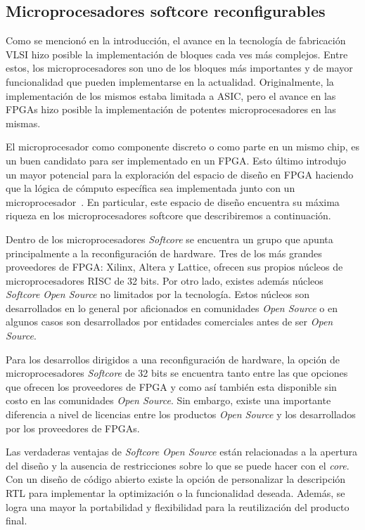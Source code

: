 \subsection{Microprocesadores softcore reconfigurables}

Como se mencionó en la introducción, el avance en la tecnología de
fabricación VLSI hizo posible la implementación de bloques cada ves
más complejos. Entre estos, los microprocesadores son uno de los
bloques más importantes y de mayor funcionalidad que pueden
implementarse en la actualidad. Originalmente, la implementación de
los mismos estaba limitada a ASIC, pero el avance en las FPGAs hizo
posible la implementación de potentes microprocesadores en las
mismas.

El microprocesador como componente discreto o como parte en un mismo 
chip, es un buen candidato para ser implementado en un FPGA. Esto último introdujo
 un mayor potencial para la exploración
del espacio de diseño en FPGA haciendo que la lógica de cómputo
específica sea implementada junto con un
microprocesador~\cite{Etiqueta05}. En particular, este espacio de
diseño encuentra su máxima riqueza en los microprocesadores softcore
que describiremos a continuación.
	
Dentro de los microprocesadores \textit{Softcore} se encuentra un
grupo que apunta principalmente a la reconfiguración de hardware.
Tres de los más grandes proveedores de FPGA: Xilinx, Altera y Lattice,
ofrecen sus propios núcleos de microprocesadores RISC de 32 bits. Por
otro lado, existes además núcleos \textit{Softcore} \textit{Open
  Source} no limitados por la tecnología. Estos núcleos son
desarrollados en lo general por aficionados en comunidades
\textit{Open Source} o en algunos casos son desarrollados por
entidades comerciales antes de ser \textit{Open Source}.
	
Para los desarrollos dirigidos a una reconfiguración de hardware, la
opción de microprocesadores \textit{Softcore} de 32 bits se encuentra
tanto entre las que opciones que ofrecen los proveedores de FPGA y
como así también esta disponible sin costo en las comunidades
\textit{Open Source}. Sin embargo, existe una importante diferencia a
nivel de licencias entre los productos \textit{Open Source} y los
desarrollados por los proveedores de FPGAs.

Las verdaderas ventajas de \textit{Softcore Open Source} están
relacionadas a la apertura del diseño y la ausencia de restricciones
sobre lo que se puede hacer con el \textit{core}. Con un diseño de
código abierto existe la opción de personalizar la descripción RTL
para implementar la optimización o la funcionalidad deseada. Además,
se logra una mayor la portabilidad y flexibilidad para la
reutilización del producto final.


